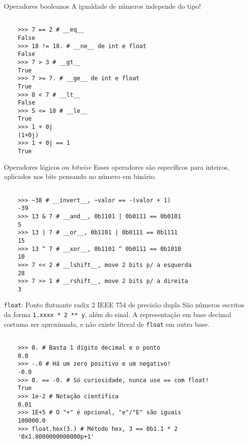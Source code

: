 \documentclass[utf8]{beamer}
\begin{document}
\begin{frame}[fragile]{Operadores booleanos}
  A igualdade de números independe do tipo!

  \begin{verbatim}

    >>> 7 == 2 # __eq__
    False
    >>> 18 != 18. # __ne__ de int e float
    False
    >>> 7 > 3 # __gt__
    True
    >>> 7 >= 7. # __ge__ de int e float
    True
    >>> 8 < 7 # __lt__
    False
    >>> 5 <= 18 # __le__
    True
    >>> 1 + 0j
    (1+0j)
    >>> 1 + 0j == 1
    True

  \end{verbatim}

\end{frame}


\begin{frame}[fragile]{Operadores lógicos ou \emph{bitwise}}
  Esses operadores são específicos para inteiros,
  aplicados nos bits pensando no número em binário.

  \begin{verbatim}

    >>> ~38 # __invert__, ~valor == -(valor + 1)
    -39
    >>> 13 & 7 # __and__, 0b1101 | 0b0111 == 0b0101
    5
    >>> 13 | 7 # __or__, 0b1101 | 0b0111 == 0b1111
    15
    >>> 13 ^ 7 # __xor__, 0b1101 ^ 0b0111 == 0b1010
    10
    >>> 7 << 2 # __lshift__, move 2 bits p/ a esquerda
    28
    >>> 7 >> 1 # __rshift__, move 2 bits p/ a direita
    3

  \end{verbatim}

\end{frame}


\begin{frame}[fragile]{\texttt{float}:
                       Ponto flutuante radix $2$
                       IEEE 754 de precisão dupla}
  São números escritos da forma \texttt{1.xxxx * 2 ** y},
  além do sinal.
  A representação em base decimal costuma ser aproximada,
  e não existe literal de \texttt{float} em outra base.

  \begin{verbatim}

    >>> 0. # Basta 1 dígito decimal e o ponto
    0.0
    >>> -.0 # Há um zero positivo e um negativo!
    -0.0
    >>> 0. == -0. # Só curiosidade, nunca use == com float!
    True
    >>> 1e-2 # Notação científica
    0.01
    >>> 1E+5 # O "+" é opcional, "e"/"E" são iguais
    100000.0
    >>> float.hex(3.) # Método hex, 3 == 0b1.1 * 2
    '0x1.8000000000000p+1'

  \end{verbatim}

\end{frame}
\end{document}
